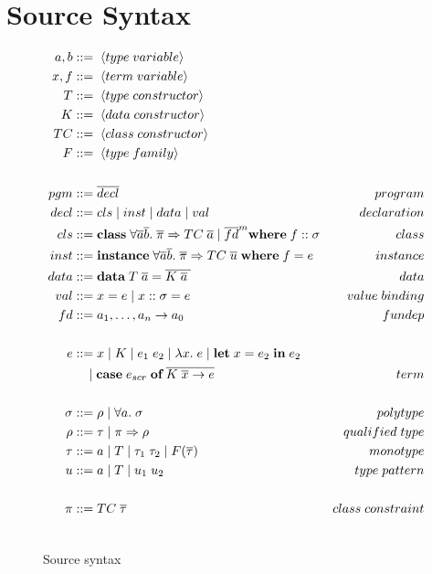 \section{Source Syntax}
\begin{figure}
\begin{align*}
    a, b &::= \; \langle type \; variable \rangle \\
    x, f &::= \; \langle term \; variable \rangle \\
    T    &::= \; \langle type \; constructor \rangle \\
    K    &::= \; \langle data \; constructor \rangle \\
    TC   &::= \; \langle class \; constructor \rangle \\
    F    &::= \; \langle type \; family \rangle \\
    \\
    pgm &::= \overline{decl} &program\\
    decl &::= cls \mid inst \mid data \mid val &declaration\\
    cls &::= \textbf{class} \; \forall \overline{a} \overline{b}. \;
    \overline{\pi} \Rightarrow TC \; \overline{a} \mid \overline{fd}^m
    \textbf{where} \; f :: \sigma &class\\
    inst &::= \textbf{instance} \; \forall \overline{a} \overline{b}. \;
    \overline{\pi} \Rightarrow TC \; \overline{u} \; \textbf{where} \; f = e
    &instance\\
    data &::= \textbf{data} \; T \; \overline{a} = \overline{K \; \overline{a}
    \;} &data\\
    val &::= x = e \mid x :: \sigma = e &value \; binding\\
    fd &::= a_1, \mathellipsis, a_n \rightarrow a_0 &fundep\\
    \\
    e &::= x \mid K \mid e_1 \; e_2 \mid \lambda x. \; e \mid \textbf{let} \; x
    = e_2 \; \textbf{in} \; e_2 \\
    &\quad \mid \textbf{case} \; e_{scr} \; \textbf{of} \; \overline{K \; \overline{x}
    \rightarrow e} &term \\
    \\
    \sigma &::= \rho \mid \forall a. \; \sigma &polytype \\
    \rho &::= \tau \mid \pi \Rightarrow \rho &qualified \; type \\
    \tau &::= a \mid T \mid \tau_1 \; \tau_2 \mid F(\overline{\tau})
         &monotype \\
    u &::= a \mid T \mid u_1 \; u_2 &type \; pattern \\
    \\
    \pi &::= TC \; \overline{\tau} &class \; constraint \\
    \\
\end{align*}
\caption{Source syntax}
\label{fig:source-syntax}
\end{figure}

